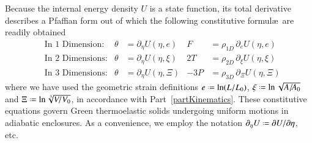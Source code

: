 Because the internal energy density $U$ is a state function, its total derivative describes a Pfaffian form \cite{Caratheodory09} out of which the following constitutive formul\ae\ are readily obtained
\begin{subequations}
    \label{GreenElasticCEs}
    \begin{align}
    \mbox{} & \text{In 1 Dimension:} & 
    \theta & = \partial_{\eta} U ( \eta , e) &
    F & = \rho_{1D} \, \partial_{e} U ( \eta , e) \\
    \mbox{} & \text{In 2 Dimensions:} &
    \theta & = \partial_{\eta} U ( \eta , \xi) &
    2T & = \rho_{2D} \, \partial_{\xi} U ( \eta , \xi) \\
    \mbox{} & \text{In 3 Dimensions:} &
    \theta & = \partial_{\eta} U ( \eta ,  \Xi) &
    -3P & = \rho_{3D} \, \partial_{\Xi} U ( \eta ,  \Xi)
    \end{align}
\end{subequations}
where we have used the geometric strain definitions $e \defeq \ln ( L / L_0 )$, $\xi \defeq \ln \sqrt{ A / \! A_0 }$ and $\Xi \defeq \ln \sqrt[3]{V \! / V_0}$, in accordance with Part~\ref{partKinematics}. These constitutive equations govern Green thermo\-elastic solids undergoing uniform motions in adiabatic enclosures.  As a convenience, we employ the notation $\partial_{\eta} U \defeq \partial U / \partial \eta$, etc.


